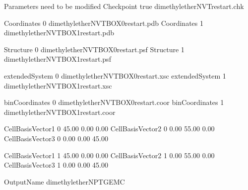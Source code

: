 \documentclass[letterpaper,10pt,english]{sphinxmanual}
\begin{document}
\begin{sphinxVerbatim}[commandchars=\\\{\}]
\PYGZsh{}\PYGZsh{}\PYGZsh{}\PYGZsh{}\PYGZsh{}\PYGZsh{}\PYGZsh{}\PYGZsh{}\PYGZsh{}\PYGZsh{}\PYGZsh{}\PYGZsh{}\PYGZsh{}\PYGZsh{}\PYGZsh{}\PYGZsh{}\PYGZsh{}\PYGZsh{}\PYGZsh{}\PYGZsh{}\PYGZsh{}\PYGZsh{}\PYGZsh{}\PYGZsh{}\PYGZsh{}\PYGZsh{}\PYGZsh{}\PYGZsh{}\PYGZsh{}\PYGZsh{}\PYGZsh{}\PYGZsh{}\PYGZsh{}\PYGZsh{}\PYGZsh{}\PYGZsh{}\PYGZsh{}\PYGZsh{}\PYGZsh{}\PYGZsh{}\PYGZsh{}\PYGZsh{}\PYGZsh{}\PYGZsh{}\PYGZsh{}\PYGZsh{}\PYGZsh{}\PYGZsh{}\PYGZsh{}\PYGZsh{}\PYGZsh{}\PYGZsh{}\PYGZsh{}\PYGZsh{}\PYGZsh{}\PYGZsh{}
\PYGZsh{} Parameters need to be modified
\PYGZsh{}\PYGZsh{}\PYGZsh{}\PYGZsh{}\PYGZsh{}\PYGZsh{}\PYGZsh{}\PYGZsh{}\PYGZsh{}\PYGZsh{}\PYGZsh{}\PYGZsh{}\PYGZsh{}\PYGZsh{}\PYGZsh{}\PYGZsh{}\PYGZsh{}\PYGZsh{}\PYGZsh{}\PYGZsh{}\PYGZsh{}\PYGZsh{}\PYGZsh{}\PYGZsh{}\PYGZsh{}\PYGZsh{}\PYGZsh{}\PYGZsh{}\PYGZsh{}\PYGZsh{}\PYGZsh{}\PYGZsh{}\PYGZsh{}\PYGZsh{}\PYGZsh{}\PYGZsh{}\PYGZsh{}\PYGZsh{}\PYGZsh{}\PYGZsh{}\PYGZsh{}\PYGZsh{}\PYGZsh{}\PYGZsh{}\PYGZsh{}\PYGZsh{}\PYGZsh{}\PYGZsh{}\PYGZsh{}\PYGZsh{}\PYGZsh{}\PYGZsh{}\PYGZsh{}\PYGZsh{}\PYGZsh{}\PYGZsh{}
Checkpoint   true   dimethylether\PYGZus{}NVT\PYGZus{}restart.chk

Coordinates     0   dimethylether\PYGZus{}NVT\PYGZus{}BOX\PYGZus{}0\PYGZus{}restart.pdb
Coordinates     1   dimethylether\PYGZus{}NVT\PYGZus{}BOX\PYGZus{}1\PYGZus{}restart.pdb

Structure     0   dimethylether\PYGZus{}NVT\PYGZus{}BOX\PYGZus{}0\PYGZus{}restart.psf
Structure     1   dimethylether\PYGZus{}NVT\PYGZus{}BOX\PYGZus{}1\PYGZus{}restart.psf

extendedSystem   0   dimethylether\PYGZus{}NVT\PYGZus{}BOX\PYGZus{}0\PYGZus{}restart.xsc
extendedSystem   1   dimethylether\PYGZus{}NVT\PYGZus{}BOX\PYGZus{}1\PYGZus{}restart.xsc

binCoordinates   0   dimethylether\PYGZus{}NVT\PYGZus{}BOX\PYGZus{}0\PYGZus{}restart.coor
binCoordinates   1   dimethylether\PYGZus{}NVT\PYGZus{}BOX\PYGZus{}1\PYGZus{}restart.coor

\PYGZsh{}CellBasisVector1   0       45.00   0.00    0.00
\PYGZsh{}CellBasisVector2   0       0.00    55.00   0.00
\PYGZsh{}CellBasisVector3   0       0.00    0.00    45.00

\PYGZsh{}CellBasisVector1   1       45.00   0.00    0.00
\PYGZsh{}CellBasisVector2   1       0.00    55.00   0.00
\PYGZsh{}CellBasisVector3   1       0.00    0.00    45.00

OutputName          dimethylether\PYGZus{}NPT\PYGZus{}GEMC
\end{sphinxVerbatim}
\end{document}
